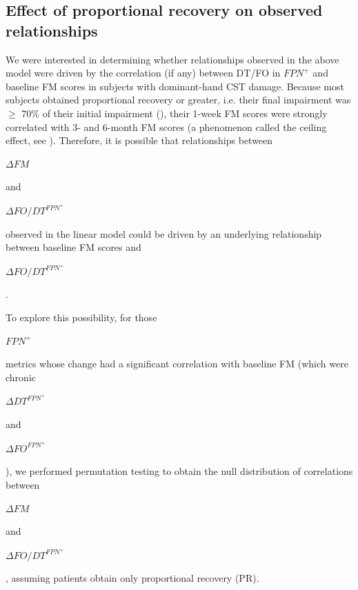 \documentclass[phd,tocprelim]{cornell}
\begin{document}
	\subsection*{Effect of proportional recovery on observed relationships}
    We were interested in determining whether relationships observed in the above model were driven by the correlation (if any) between DT/FO in $FPN^+$ and baseline FM scores in subjects with dominant-hand CST damage. Because most subjects obtained proportional recovery or greater, i.e. their final impairment was $\ge$ 70$\%$ of their initial impairment (\cite{Kundert2019-ou}), their 1-week FM scores were strongly correlated with 3- and 6-month FM scores (a phenomenon called the ceiling effect, see \cite{Hope2019-da}). Therefore, it is possible that  relationships between  \begin{Large}$\Delta FM$\end{Large}  and  \begin{Large}$\Delta FO/DT^{FPN^+}$\end{Large}  observed in the linear model could be driven by an underlying relationship between baseline FM scores and  \begin{large}$\Delta FO/DT^{FPN^+}$\end{large} . 
    
    To explore this possibility, for those  \begin{Large}$FPN^+$\end{Large}  metrics whose change had a significant correlation with baseline FM (which were chronic \begin{Large}$\Delta DT^{FPN^+}$\end{Large}  and  \begin{Large}$\Delta FO^{FPN^+}$\end{Large}), we performed permutation testing to obtain the null distribution of correlations between  \begin{Large}$\Delta FM$\end{Large}  and  \begin{Large}$\Delta FO/DT^{FPN^+}$\end{Large} , assuming patients obtain only proportional recovery (PR). 
    
\end{document}
